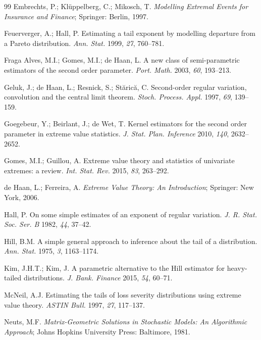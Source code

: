 \begin{thebibliography}{99}
 Embrechts, P.; Kl{\"u}ppelberg, C.; Mikosch, T. \textit{Modelling Extremal Events for Insurance and Finance}; Springer: Berlin, 1997.

 Feuerverger, A.; Hall, P. Estimating a tail exponent by modelling departure from a Pareto distribution. \textit{Ann. Stat.} 1999, \textit{27}, 760--781.

 Fraga Alves, M.I.; Gomes, M.I.; de Haan, L. A new class of semi-parametric estimators of the second order parameter. \textit{Port. Math.} 2003, \textit{60}, 193--213.

 Geluk, J.; de Haan, L.; Resnick, S.; St{\u{a}}ric{\u{a}}, C. Second-order regular variation, convolution and the central limit theorem. \textit{Stoch. Process. Appl.} 1997, \textit{69}, 139--159.

 Goegebeur, Y.; Beirlant, J.; de Wet, T. Kernel estimators for the second order parameter in extreme value statistics. \textit{J. Stat. Plan. Inference} 2010, \textit{140}, 2632--2652.

 Gomes, M.I.; Guillou, A. Extreme value theory and statistics of univariate extremes: a review. \textit{Int. Stat. Rev.} 2015, \textit{83}, 263--292.

 de Haan, L.; Ferreira, A. \textit{Extreme Value Theory: An Introduction}; Springer: New York, 2006.

 Hall, P. On some simple estimates of an exponent of regular variation. \textit{J. R. Stat. Soc. Ser. B} 1982, \textit{44}, 37--42.

 Hill, B.M. A simple general approach to inference about the tail of a distribution. \textit{Ann. Stat.} 1975, \textit{3}, 1163--1174.

 Kim, J.H.T.; Kim, J. A parametric alternative to the Hill estimator for heavy-tailed distributions. \textit{J. Bank. Finance} 2015, \textit{54}, 60--71.

 McNeil, A.J. Estimating the tails of loss severity distributions using extreme value theory. \textit{ASTIN Bull.} 1997, \textit{27}, 117--137.

 Neuts, M.F. \textit{Matrix-Geometric Solutions in Stochastic Models: An Algorithmic Approach}; Johns Hopkins University Press: Baltimore, 1981.


\end{thebibliography}
